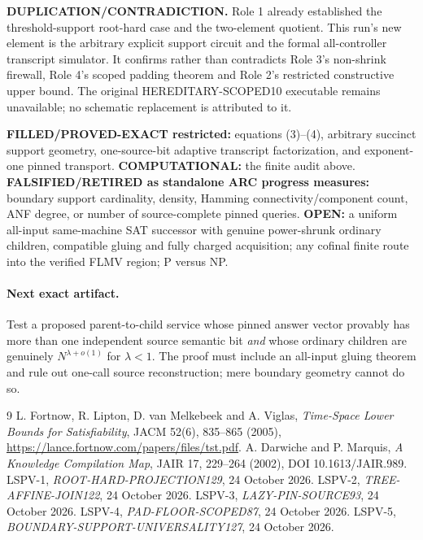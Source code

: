 \documentclass[11pt]{article}
\begin{document}
\textbf{DUPLICATION/CONTRADICTION.}  Role 1 already established the
threshold-support root-hard case and the two-element quotient.  This run's
new element is the arbitrary explicit support circuit and the formal
all-controller transcript simulator.  It confirms rather than contradicts
Role 3's non-shrink firewall, Role 4's scoped padding theorem and Role 2's
restricted constructive upper bound.  The original HEREDITARY-SCOPED10
executable remains unavailable; no schematic replacement is attributed to it.

\textbf{FILLED/PROVED-EXACT restricted:} equations (3)--(4), arbitrary
succinct support geometry, one-source-bit adaptive transcript factorization,
and exponent-one pinned transport.  \textbf{COMPUTATIONAL:} the finite audit
above.  \textbf{FALSIFIED/RETIRED as standalone ARC progress measures:}
boundary support cardinality, density, Hamming connectivity/component count,
ANF degree, or number of source-complete pinned queries.  \textbf{OPEN:} a
uniform all-input same-machine SAT successor with genuine power-shrunk
ordinary children, compatible gluing and fully charged acquisition; any
cofinal finite route into the verified FLMV region; P versus NP.

\paragraph{Next exact artifact.}  Test a proposed parent-to-child service
whose pinned answer vector provably has more than one independent source
semantic bit \emph{and} whose ordinary children are genuinely
$N^{\lambda+o(1)}$ for $\lambda<1$.  The proof must include an all-input
gluing theorem and rule out one-call source reconstruction; mere boundary
geometry cannot do so.

\begin{thebibliography}{9}
 L. Fortnow, R. Lipton, D. van Melkebeek and A. Viglas,
\emph{Time-Space Lower Bounds for Satisfiability}, JACM 52(6), 835--865
(2005), \url{https://lance.fortnow.com/papers/files/tst.pdf}.
 A. Darwiche and P. Marquis, \emph{A Knowledge Compilation Map},
JAIR 17, 229--264 (2002), DOI 10.1613/JAIR.989.
 LSPV-1, \emph{ROOT-HARD-PROJECTION129}, 24 October 2026.
 LSPV-2, \emph{TREE-AFFINE-JOIN122}, 24 October 2026.
 LSPV-3, \emph{LAZY-PIN-SOURCE93}, 24 October 2026.
 LSPV-4, \emph{PAD-FLOOR-SCOPED87}, 24 October 2026.
 LSPV-5, \emph{BOUNDARY-SUPPORT-UNIVERSALITY127}, 24 October 2026.
\end{thebibliography}
\end{document}
